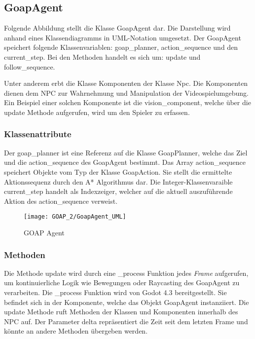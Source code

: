 \subsection{GoapAgent}

Folgende Abbildung stellt die Klasse GoapAgent dar. Die Darstellung wird anhand eines Klassendiagramms in UML-Notation umgesetzt. Der GoapAgent speichert folgende Klassenvariablen: goap\_planner, action\_sequence und den current\_step. Bei den Methoden handelt es sich um: update und follow\_sequence. 

Unter anderem erbt die Klasse Komponenten der Klasse Npc. Die Komponenten dienen dem NPC zur Wahrnehmung und Manipulation der Videospielumgebung. Ein Beispiel einer solchen Komponente ist die vision\_component, welche über die update Methode aufgerufen, wird um den Spieler zu erfassen.


\subsubsection{Klassenattribute}

Der goap\_planner ist eine Referenz auf die Klasse GoapPlanner, welche das Ziel und die action\_sequence des GoapAgent bestimmt. Das Array action\_sequence speichert Objekte vom Typ der Klasse GoapAction. Sie stellt die ermittelte Aktionssequenz durch den A* Algorithmus dar. Die Integer-Klassenvaraible current\_step handelt als Indexzeiger, welcher auf die aktuell auszuführende Aktion des action\_sequence verweist.

\begin{figure}[h]
  \centering
  \texttt{[image: GOAP\_2/GoapAgent\_UML]}
	\captionsetup{justification=justified, format=plain}
  \caption{GOAP Agent}
  \label{GOAP Agent}
\end{figure}


\subsubsection{Methoden}

Die Methode update wird durch eine \_process Funktion jedes \textit{Frame} aufgerufen, um kontinuierliche Logik wie Bewegungen oder Raycasting des GoapAgent zu verarbeiten. Die \_process Funktion wird von Godot 4.3 bereitgestellt. Sie befindet sich in der Komponente, welche das Objekt GoapAgent instanziiert. Die update Methode ruft Methoden der Klassen und Komponenten innerhalb des NPC auf. Der Parameter delta repräsentiert die Zeit seit dem letzten Frame und könnte an andere Methoden übergeben werden.

